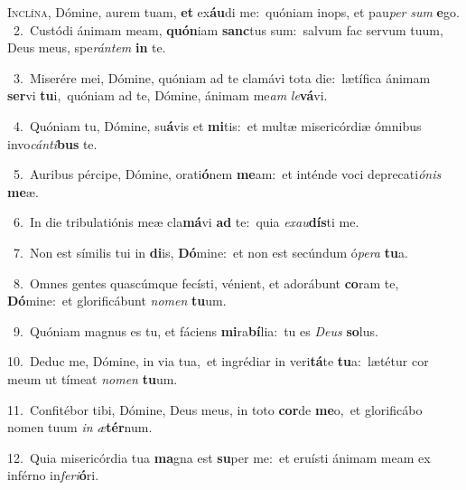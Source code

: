 \lettrine{\initial\textcolor{\initialcolor}{I}}{nclína,} Dómine, aurem tuam, \textbf{et} ex\-\textbf{áu}\-di me:~\star quóniam inops, et pau\textit{per} \textit{sum} \textbf{e}\-go.\\
{\numbfont\textcolor{\numbcolor}{~2.}}~Custódi ánimam meam, \textbf{quón}\-iam \textbf{sanc}\-tus sum:~\star salvum fac servum tuum, Deus meus, spe\-\textit{rán}\-\textit{tem} \textbf{in} te.\par
{\numbfont\textcolor{\numbcolor}{~3.}}~Miserére mei, Dómine, quóniam ad te clamávi tota die:~\dagger lætífica ánimam \textbf{ser}\-vi \textbf{tu}\-i,~\star quóniam ad te, Dómine, ánimam me\textit{am} \textit{le}\-\textbf{vá}vi.\par
{\numbfont\textcolor{\numbcolor}{~4.}}~Quóniam tu, Dómine, su\-\textbf{á}\-vis et \textbf{mi}\-tis:~\star et multæ misericórdiæ ómnibus invo\-\textit{cán}\-\textit{ti}\textbf{bus} te.\par
{\numbfont\textcolor{\numbcolor}{~5.}}~Auribus pércipe, Dómine, orati\-\textbf{ó}\-nem \textbf{me}\-am:~\star et inténde voci deprecati\-\textit{ó}\-\textit{nis} \textbf{me}\-æ.\par
{\numbfont\textcolor{\numbcolor}{~6.}}~In die tribulatiónis meæ cla\-\textbf{má}\-vi \textbf{ad} te:~\star quia \textit{ex}\-\textit{au}\textbf{dís}ti me.\par
{\numbfont\textcolor{\numbcolor}{~7.}}~Non est símilis tui in \textbf{di}\-is, \textbf{Dó}\-mine:~\star et non est secúndum ó\-\textit{pe}\-\textit{ra} \textbf{tu}\-a.\par
{\numbfont\textcolor{\numbcolor}{~8.}}~Omnes gentes quascúmque fecísti, vénient, et adorábunt \textbf{co}\-ram te, \textbf{Dó}\-mine:~\star et glorificábunt \textit{no}\-\textit{men} \textbf{tu}\-um.\par
{\numbfont\textcolor{\numbcolor}{~9.}}~Quóniam magnus es tu, et fáciens \textbf{mi}\-ra\-\textbf{bí}\-lia:~\star tu es \textit{De}\-\textit{us} \textbf{so}\-lus.\par
{\numbfont\textcolor{\numbcolor}{10.}}~Deduc me, Dómine, in via tua,~\dagger et ingrédiar in veri\-\textbf{tá}\-te \textbf{tu}\-a:~\star lætétur cor meum ut tímeat \textit{no}\-\textit{men} \textbf{tu}\-um.\par
{\numbfont\textcolor{\numbcolor}{11.}}~Confitébor tibi, Dómine, Deus meus, in toto \textbf{cor}\-de \textbf{me}\-o,~\star et glorificábo nomen tuum \textit{in} \textit{æ}\-\textbf{tér}num.\par
{\numbfont\textcolor{\numbcolor}{12.}}~Quia misericórdia tua \textbf{ma}\-gna est \textbf{su}\-per me:~\star et eruísti ánimam meam ex inférno in\-\textit{fe}\-\textit{ri}\textbf{ó}ri.\par
